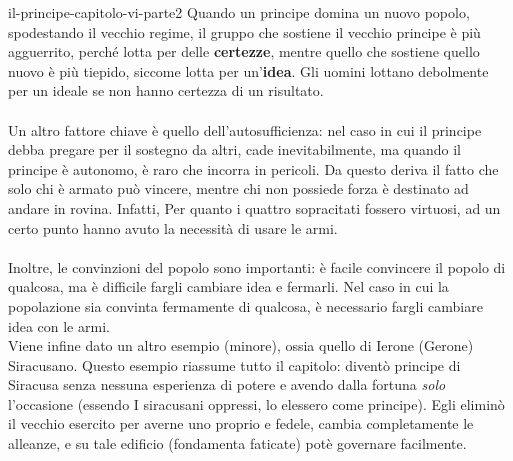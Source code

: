 \documentclass[preview]{standalone}
\begin{document}
\begin{snippet}{il-principe-capitolo-vi-parte2}
    Quando un principe domina un nuovo popolo, spodestando il vecchio regime,
    il gruppo che sostiene il vecchio principe è più agguerrito, perché lotta per delle \textbf{certezze},
    mentre quello che sostiene quello nuovo è più tiepido, siccome lotta per un'\textbf{idea}.
    Gli uomini lottano debolmente per un ideale se non hanno certezza di un risultato.
    \\\\
    Un altro fattore chiave è quello dell'autosufficienza:
    nel caso in cui il principe debba pregare per il sostegno da altri, cade inevitabilmente,
    ma quando il principe è autonomo, è raro che incorra in pericoli.
    Da questo deriva il fatto che solo chi è armato può vincere, mentre chi
    non possiede forza è destinato ad andare in rovina.
    Infatti, Per quanto i quattro sopracitati fossero virtuosi, ad un certo punto hanno avuto la necessità
    di usare le armi.
    \\\\
    Inoltre, le convinzioni del popolo sono importanti: è facile convincere il popolo di qualcosa,
    ma è difficile fargli cambiare idea e fermarli.
    Nel caso in cui la popolazione sia convinta fermamente di qualcosa, è necessario
    fargli cambiare idea con le armi.
    \\

    Viene infine dato un altro esempio (minore), ossia quello di Ierone (Gerone) Siracusano.
    Questo esempio riassume tutto il capitolo: diventò principe di Siracusa
    senza nessuna esperienza di potere e avendo dalla fortuna \textit{solo} l'occasione
    (essendo I siracusani oppressi, lo elessero come principe).
    Egli eliminò il vecchio esercito per averne uno proprio e fedele,
    cambia completamente le alleanze, e su tale edificio (fondamenta faticate) potè
    governare facilmente.
\end{snippet}
\end{document}
